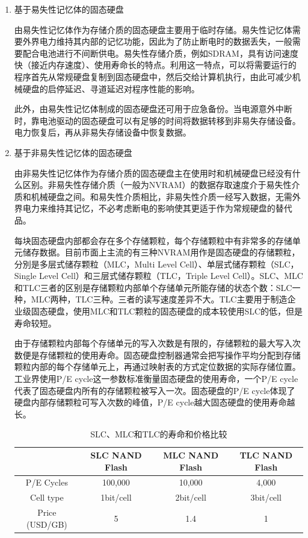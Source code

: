 \begin{enumerate}
\item 基于易失性记忆体的固态硬盘

由易失性记忆体作为存储介质的固态硬盘主要用于临时存储。易失性记忆体需要外界电力维持其内部的记忆功能，因此为了防止断电时的数据丢失，一般需要配合电池进行不间断供电。易失性存储介质，例如SDRAM，具有访问速度快（接近内存速度）、使用寿命长的特点。利用这一特点，可以将需要运行的程序首先从常规硬盘复制到固态硬盘中，然后交给计算机执行，由此可减少机械硬盘的启停延迟、寻道延迟对程序性能的影响。

此外，由易失性记忆体制成的固态硬盘还可用于应急备份。当电源意外中断时，靠电池驱动的固态硬盘可以有足够的时间将数据转移到非易失存储设备。电力恢复后，再从非易失存储设备中恢复数据。

\item 基于非易失性记忆体的固态硬盘

由非易失性记忆体作为存储介质的固态硬盘主在使用时和机械硬盘已经没有什么区别。非易失性存储介质（一般为NVRAM）的数据存取速度介于易失性介质和机械硬盘之间。和易失性介质相比，非易失性介质一经写入数据，无需外界电力来维持其记忆，不必考虑断电的影响使其更适于作为常规硬盘的替代品。

每块固态硬盘内部都会存在多个存储颗粒，每个存储颗粒中有非常多的存储单元储存数据。目前市面上主流的有三种NVRAM用作是固态硬盘的存储颗粒，分別是多层式储存颗粒（MLC，Multi Level Cell）、单层式储存颗粒（SLC，Single Level Cell）和三层式储存颗粒（TLC，Triple Level Cell）。SLC、MLC和TLC三者的区别是存储颗粒内部单个存储单元所能存储的状态个数：SLC一种，MLC两种，TLC三种。三者的读写速度差异不大。TLC主要用于制造企业级固态硬盘，使用MLC和TLC颗粒的固态硬盘的成本较使用SLC的低，但是寿命较短。

由于存储颗粒内部每个存储单元的写入次数是有限的，存储颗粒的最大写入次数便是存储颗粒的使用寿命。固态硬盘控制器通常会把写操作平均分配到存储颗粒内部的每个存储单元上，再通过映射表的方式定位数据的实际存储位置。工业界使用P/E cycle这一参数标准衡量固态硬盘的使用寿命，一个P/E cycle代表了固态硬盘内所有的存储颗粒被写入一次。固态硬盘的P/E cycle体现了硬盘内部存储颗粒可写入次数的峰值，P/E cycle越大固态硬盘的使用寿命越长。

\begin{table}[htb]
\centering
\caption{SLC、MLC和TLC的寿命和价格比较}
\begin{tabular}{|c|c|c|c|}
\hline  & SLC NAND Flash & MLC NAND Flash & TLC NAND Flash \\
\hline P/E Cycles & 100,000 & 10,000 & 4,000 \\
\hline Cell type & 1bit/cell & 2bit/cell & 3bit/cell \\
\hline Price (USD/GB) & 5 & 1.4 & 1 \\
\hline
\end{tabular}
\label{tab:slc-mlc-tlc-compare}
\end{table}


\end{enumerate}
